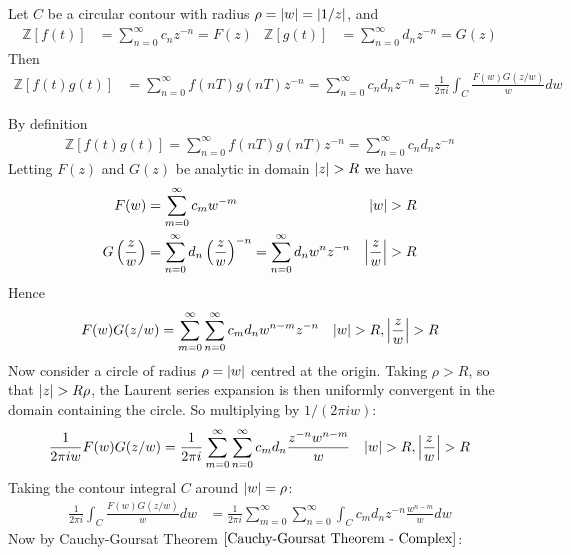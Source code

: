 \documentclass[12pt, english]{book}
\makeatletter
\renewenvironment{proof}[1][\proofname]{\par
	\pushQED{\qed}%
	\normalfont \topsep6\p@\@plus6\p@\relax
	\list{}{%
		\settowidth{\leftmargin}{\itshape\proofname:\hskip\labelsep}%
		\setlength{\labelwidth}{0pt}%
		\setlength{\itemindent}{-\leftmargin}%
	}%
	\item[\hskip\labelsep\itshape#1\@addpunct{:}]\ignorespaces
}{%
	\popQED\endlist\@endpefalse
}
\makeatother
\begin{document}
	\begin{definition}
		Let \(C\) be a circular contour with radius \(\rho = \abs{w} = \abs{1/z}\), and
		\begin{align*}
			\mathbb{Z}[f(t)] &= \sum_{n=0}^{\infty} c_n z^{-n} = F(z) &
			\mathbb{Z}[g(t)] &= \sum_{n=0}^{\infty} d_n z^{-n} = G(z)
		\end{align*}
		Then
		\begin{align*}
			\mathbb{Z}[f(t)g(t)] 
			&= \sum_{n=0}^{\infty} f(nT) g(nT) z^{-n} = \sum_{n=0}^{\infty} c_n d_n z^{-n}
			 = \frac{1}{2\pi i} \int_{C} \frac{F(w)G(z/w)}{w} dw
		\end{align*}
	\end{definition}
	\begin{proof}
		By definition 
		\begin{align*}
			\mathbb{Z}[f(t)g(t)] = \sum_{n=0}^{\infty} f(nT) g(nT) z^{-n} = \sum_{n=0}^{\infty} c_n d_n z^{-n}
		\end{align*}
		Letting \(F(z)\) and \(G(z)\) be analytic in domain \(\abs{z}>R\) we have
		\begin{align*}
			F(w) &= \sum_{m=0}^{\infty} c_m w^{-m} & \abs{w} > R \\
			G\left(\frac{z}{w}\right) &= \sum_{n=0}^{\infty} d_n \left(\frac{z}{w}\right)^{-n} = \sum_{n=0}^{\infty} d_n w^n z^{-n} & \abs{\frac{z}{w}} > R
		\end{align*}
		Hence
		\begin{align*}
			F(w) G(z/w) &= \sum_{m=0}^{\infty} \sum_{n=0}^{\infty} c_m d_n w^{n-m} z^{-n}
				& \abs{w}>R, \abs{\frac{z}{w}}> R
		\end{align*}
		Now consider a circle of radius \(\rho = \abs{w}\) centred at the origin. Taking \(\rho > R\), so that \(\abs{z} > R\rho\), the Laurent series expansion is then uniformly convergent in the domain containing the circle. So multiplying by \(1/(2\pi i w)\):
		\begin{align*}
			\frac{1}{2\pi i w} F(w) G(z/w) 
			&= \frac{1}{2\pi i}\sum_{m=0}^{\infty} \sum_{n=0}^{\infty} c_m d_n \frac{z^{-n} w^{n-m}}{w}
				& \abs{w}>R, \abs{\frac{z}{w}}> R
		\end{align*}
		Taking the contour integral \(C\) around \(\abs{w} = \rho\):
		\begin{align*}
			\frac{1}{2\pi i} \int_{C} \frac{F(w)G(z/w)}{w} dw 
			&= \frac{1}{2\pi i} \sum_{m=0}^{\infty} \sum_{n=0}^{\infty} \int_{C} c_m d_n z^{-n} \frac{w^{n-m}}{w} dw
		\end{align*}
		Now by Cauchy-Goursat Theorem \(\cref{Cauchy-Goursat Theorem - Complex}\):

\end{proof}
\end{document}
